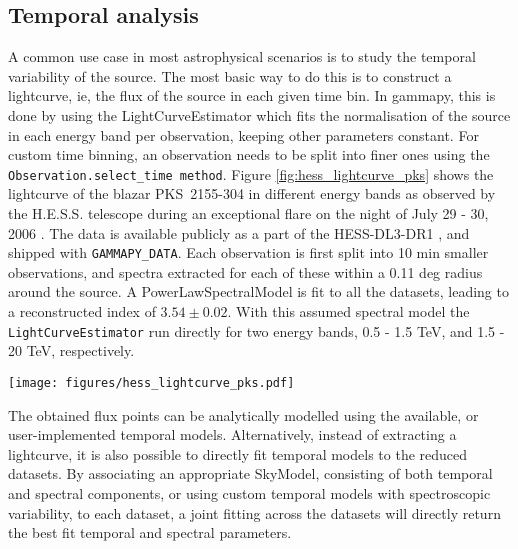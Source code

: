 \subsection{Temporal analysis}
\label{ssec:temporal-analysis}

A common use case in most astrophysical scenarios is to study the temporal variability of the source. The most basic way to do this is to construct a lightcurve, ie, the flux of the source in each given time bin. In gammapy, this is done by using the LightCurveEstimator which fits the normalisation of the source in each energy band per observation, keeping other parameters constant. For custom time binning, an observation needs to be split into finer ones using the \verb"Observation.select_time method". Figure \ref{fig:hess_lightcurve_pks} shows the lightcurve of the blazar PKS~2155-304 in different energy bands as observed by the H.E.S.S. telescope during an exceptional flare on the night of July 29 - 30, 2006 \cite{2009A&A...502..749A}. The data is available publicly as a part of the HESS-DL3-DR1 \cite{HESS-DL3-DR1}, and shipped with \verb"GAMMAPY_DATA". Each observation is first split into 10 min smaller observations, and spectra extracted for each of these within a 0.11 deg radius around the source. A PowerLawSpectralModel is fit to all the datasets, leading to a reconstructed index of $3.54 \pm 0.02$. With this assumed spectral model the \verb"LightCurveEstimator" run directly for two energy bands, 0.5 - 1.5 TeV, and 1.5 - 20 TeV,  respectively.


\begin{figure*}[t]
	\centering
	\texttt{[image: figures/hess\_lightcurve\_pks.pdf]}
	\caption{10 min binned lightcurve for PKS~2155-304 in two energy bands, (500 GeV - 1.5 TeV, and 1.5 TeV to 20 TeV) as observed by the H.E.S.S. telescopes in 2006.}
	\label{fig:hess_lightcurve_pks}
\end{figure*}

The obtained flux points can be analytically modelled using the available, or user-implemented temporal models. Alternatively, instead of  extracting a lightcurve, it is also possible to directly fit temporal models to the reduced datasets. By associating an appropriate SkyModel, consisting of both temporal and spectral components, or using custom temporal models with spectroscopic variability, to each dataset, a joint fitting across the datasets will directly return the best fit temporal and spectral parameters.
